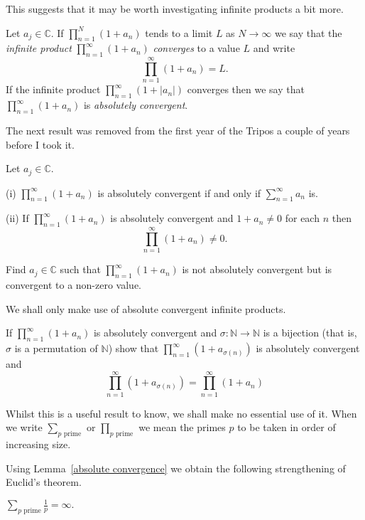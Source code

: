 This suggests that it may be worth investigating 
infinite products a bit more.
\begin{definition} Let $a_{j}\in{\mathbb C}$. If
$\prod_{n=1}^{N}(1+a_{n})$ tends to a limit $L$
as $N\rightarrow\infty$ we say that the 
\emph{infinite product} $\prod_{n=1}^{\infty}(1+a_{n})$
\emph{converges} to a value $L$ and write
\[\prod_{n=1}^{\infty}(1+a_{n})=L.\]
If the infinite product $\prod_{n=1}^{\infty}(1+|a_{n}|)$
converges then we say that $\prod_{n=1}^{\infty}(1+a_{n})$
is \emph{absolutely convergent}.
\end{definition}
The next result was removed from the first year of
the Tripos a couple of years before I took it.
\begin{lemma}\label{absolute convergence} 
Let $a_{j}\in{\mathbb C}$.

(i) $\prod_{n=1}^{\infty}(1+a_{n})$ is absolutely
convergent if and only if $\sum_{n=1}^{\infty}a_{n}$
is.

(ii) If $\prod_{n=1}^{\infty}(1+a_{n})$ is absolutely
convergent and $1+a_{n}\neq 0$ for each $n$ then
\[\prod_{n=1}^{\infty}(1+a_{n})\neq 0.\]
\end{lemma}
\begin{exercise} Find $a_{j}\in{\mathbb C}$ such that
$\prod_{n=1}^{\infty}(1+a_{n})$ is not absolutely
convergent but is convergent to a non-zero value.
\end{exercise}
We shall only make use of absolute convergent infinite
products.
\begin{exercise} If $\prod_{n=1}^{\infty}(1+a_{n})$ is 
absolutely convergent and 
$\sigma:{\mathbb N}\rightarrow{\mathbb N}$
is a bijection 
(that is, $\sigma$ is a permutation of ${\mathbb N}$)
show that $\prod_{n=1}^{\infty}(1+a_{\sigma(n)})$ is 
absolutely convergent and
\[\prod_{n=1}^{\infty}(1+a_{\sigma(n)})
=\prod_{n=1}^{\infty}(1+a_{n})\]
\end{exercise}
Whilst this is a useful result to know, we shall make no essential
use of it. When we write
$\sum_{\text{$p$ prime}}$ or $\prod_{\text{$p$ prime}}$
we mean the primes $p$ to be taken in order of increasing
size.

Using Lemma~\ref{absolute convergence} we obtain
the following strengthening of Euclid's theorem.
\begin{theorem}[Euler]
${\displaystyle \sum_{\text{$p$ prime}}\frac{1}{p}=\infty.}$
\end{theorem}

